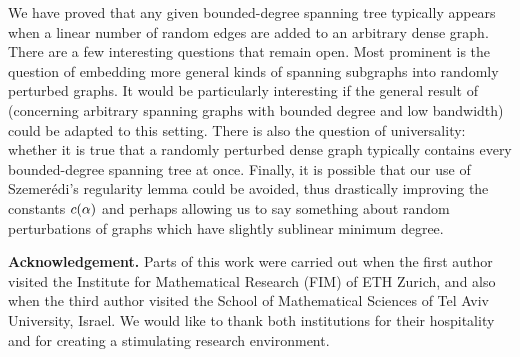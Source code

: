 \documentclass[11pt,english]{article}
\theoremstyle{plain}
\theoremstyle{plain}
\theoremstyle{plain}
\theoremstyle{plain}
\theoremstyle{plain}
\theoremstyle{definition}
\theoremstyle{definition}
\theoremstyle{remark}
\theoremstyle{remark}
\theoremstyle{plain}
\theoremstyle{definition}
\theoremstyle{definition}
\theoremstyle{plain}
\theoremstyle{plain}
\theoremstyle{plain}
\theoremstyle{plain}
\theoremstyle{remark}
\theoremstyle{plain}
\theoremstyle{definition}
\let\originalleft\left
\let\originalright\right
\renewcommand{\left}{\mathopen{}\mathclose\bgroup\originalleft}
\renewcommand{\right}{\aftergroup\egroup\originalright}
\begin{document}
We have proved that any given bounded-degree spanning tree typically
appears when a linear number of random edges are added to an arbitrary
dense graph. There are a few interesting questions that remain open.
Most prominent is the question of embedding more general kinds of
spanning subgraphs into randomly perturbed graphs. It would be particularly
interesting if the general result of \cite{BST09} (concerning arbitrary
spanning graphs with bounded degree and low bandwidth) could be adapted
to this setting. There is also the question of universality: whether
it is true that a randomly perturbed dense graph typically contains
every bounded-degree spanning tree at once. Finally, it is possible
that our use of Szemer\'edi's regularity lemma could be avoided,
thus drastically improving the constants $\c\left(\a\right)$ and
perhaps allowing us to say something about random perturbations of
graphs which have slightly sublinear minimum degree.

\noindent \textbf{Acknowledgement.} Parts of this work were carried
out when the first author visited the Institute for Mathematical Research
(FIM) of ETH Zurich, and also when the third author visited the School
of Mathematical Sciences of Tel Aviv University, Israel. We would
like to thank both institutions for their hospitality and for creating
a stimulating research environment.
\end{document}
